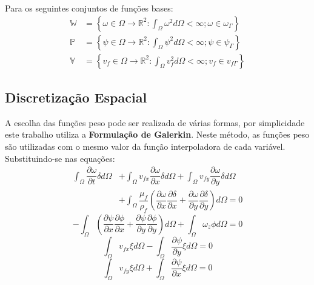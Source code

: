 Para os seguintes conjuntos de funções bases:
\begin{align}
    \mathbb{W}&=\left\{\omega \in \Omega \rightarrow \mathbb{R}^2: 
    \int_{\Omega} \omega^2 d\Omega < \infty; \omega \in \omega_{\Gamma}\right\} \\
    \mathbb{P}&=\left\{\psi \in \Omega \rightarrow \mathbb{R}^2: 
    \int_{\Omega} \psi^2 d\Omega < \infty; \psi \in \psi_{\Gamma}\right\} \\
    \mathbb{V}&=\left\{v_f \in \Omega \rightarrow \mathbb{R}^2: 
    \int_{\Omega} v_f^2 d\Omega < \infty; v_f \in v_{f\Gamma}\right\}
\end{align}


\subsection{\textbf{Discretização Espacial}}
A escolha das funções peso pode ser realizada de várias formas, por simplicidade este trabalho utiliza a \textbf{Formulação de Galerkin}.
Neste método, as funções peso são utilizadas com o mesmo valor da função interpoladora de cada variável. 
Substituindo-se nas equações:
\begin{align}
    \int_{\Omega}
    \dfrac{\partial \omega}{\partial t}
    \delta d\Omega &+
    \int_{\Omega}
    v_{fx}\dfrac{\partial \omega}{\partial x}
    \delta d\Omega +
    \int_{\Omega}
    v_{fy}\dfrac{\partial \omega}{\partial y}
    \delta d\Omega \nonumber\\&+
    \int_{\Omega}
    \dfrac{\mu_f}{\rho_f}
    \left(
    \dfrac{\partial \omega}{\partial x}
    \dfrac{\partial \delta}{\partial x} +
    \dfrac{\partial \omega}{\partial y}
    \dfrac{\partial \delta}{\partial y}
    \right) d\Omega= 0
\end{align}
\begin{equation}
    -\int_{\Omega}
    \left(
    \dfrac{\partial \psi}{\partial x}
    \dfrac{\partial \phi}{\partial x} +
    \dfrac{\partial \psi}{\partial y}
    \dfrac{\partial \phi}{\partial y}
    \right) d\Omega +
    \int_{\Omega}
    \omega_z
    \phi d\Omega = 0
\end{equation}
\begin{equation}
    \int_{\Omega}
    v_{fx}
    \xi d\Omega -
    \int_{\Omega}
    \dfrac{\partial \psi}{\partial y}
    \xi d\Omega = 0
\end{equation}
\begin{equation}
    \int_{\Omega}
    v_{fy}
    \xi d\Omega +
    \int_{\Omega}
    \dfrac{\partial \psi}{\partial x}
    \xi d\Omega = 0
\end{equation}

